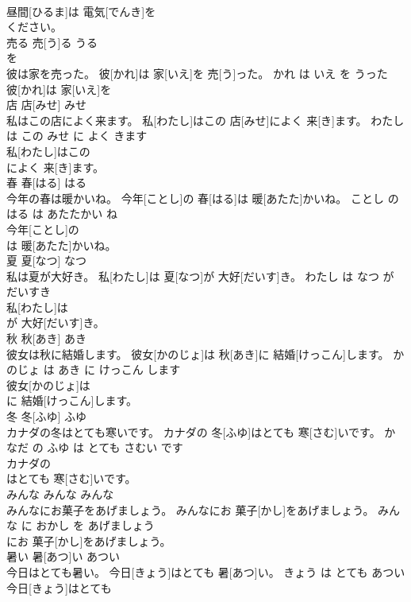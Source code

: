 \documentclass[8pt]{extreport}
\begin{document}
\begin{CJK}{UTF8}{min}
\\	昼間[ひるま]は 電気[でんき]を
\\	ください。		
\\	売る	売[う]る	うる	
\\	を		
\\	彼は家を売った。	彼[かれ]は 家[いえ]を 売[う]った。	かれ は いえ を うった	
\\	彼[かれ]は 家[いえ]を
\\	店	店[みせ]	みせ	
\\	私はこの店によく来ます。	私[わたし]はこの 店[みせ]によく 来[き]ます。	わたし は この みせ に よく きます	
\\	私[わたし]はこの
\\	によく 来[き]ます。		
\\	春	春[はる]	はる	
\\	今年の春は暖かいね。	今年[ことし]の 春[はる]は 暖[あたた]かいね。	ことし の はる は あたたかい ね	
\\	今年[ことし]の
\\	は 暖[あたた]かいね。		
\\	夏	夏[なつ]	なつ	
\\	私は夏が大好き。	私[わたし]は 夏[なつ]が 大好[だいす]き。	わたし は なつ が だいすき	
\\	私[わたし]は
\\	が 大好[だいす]き。		
\\	秋	秋[あき]	あき	
\\	彼女は秋に結婚します。	彼女[かのじょ]は 秋[あき]に 結婚[けっこん]します。	かのじょ は あき に けっこん します	
\\	彼女[かのじょ]は
\\	に 結婚[けっこん]します。		
\\	冬	冬[ふゆ]	ふゆ	
\\	カナダの冬はとても寒いです。	カナダの 冬[ふゆ]はとても 寒[さむ]いです。	かなだ の ふゆ は とても さむい です	
\\	カナダの
\\	はとても 寒[さむ]いです。		
\\	みんな	みんな	みんな	
\\	みんなにお菓子をあげましょう。	みんなにお 菓子[かし]をあげましょう。	みんな に おかし を あげましょう	
\\	にお 菓子[かし]をあげましょう。		
\\	暑い	暑[あつ]い	あつい	
\\	今日はとても暑い。	今日[きょう]はとても 暑[あつ]い。	きょう は とても あつい	
\\	今日[きょう]はとても

\end{CJK}
\end{document}
